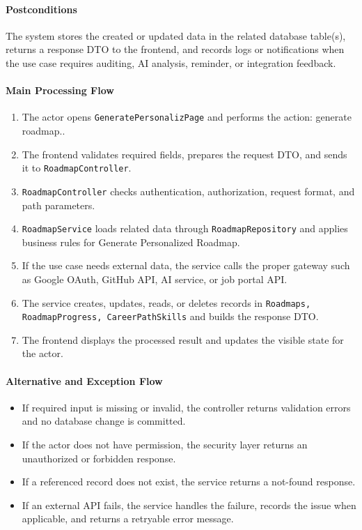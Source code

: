 \paragraph{Postconditions}

The system stores the created or updated data in the related database table(s), returns a response DTO to the frontend, and records logs or notifications when the use case requires auditing, AI analysis, reminder, or integration feedback.

\paragraph{Main Processing Flow}

\begin{enumerate}
    \item The actor opens \texttt{GeneratePersonalizPage} and performs the action: generate roadmap..
    \item The frontend validates required fields, prepares the request DTO, and sends it to \texttt{RoadmapController}.
    \item \texttt{RoadmapController} checks authentication, authorization, request format, and path parameters.
    \item \texttt{RoadmapService} loads related data through \texttt{RoadmapRepository} and applies business rules for Generate Personalized Roadmap.
    \item If the use case needs external data, the service calls the proper gateway such as Google OAuth, GitHub API, AI service, or job portal API.
    \item The service creates, updates, reads, or deletes records in \texttt{Roadmaps, RoadmapProgress, CareerPathSkills} and builds the response DTO.
    \item The frontend displays the processed result and updates the visible state for the actor.
\end{enumerate}

\paragraph{Alternative and Exception Flow}

\begin{itemize}
    \item If required input is missing or invalid, the controller returns validation errors and no database change is committed.
    \item If the actor does not have permission, the security layer returns an unauthorized or forbidden response.
    \item If a referenced record does not exist, the service returns a not-found response.
    \item If an external API fails, the service handles the failure, records the issue when applicable, and returns a retryable error message.
\end{itemize}

